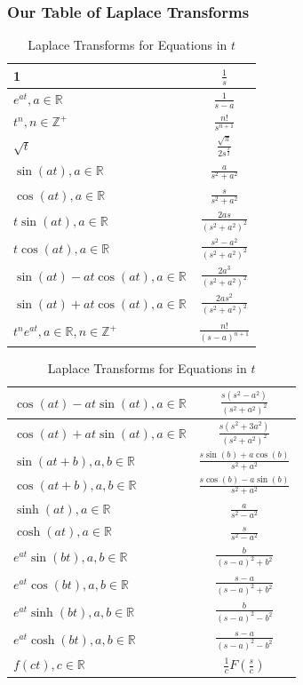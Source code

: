 \documentclass[a4paper,twoside]{article}
\begin{document}
		\subsubsection{Our Table of Laplace Transforms}
			\bgroup
			\everymath{\displaystyle}
			\def\arraystretch{2.5}
			\begin{table}[H]
				\footnotesize
				\begin{tabular}[t]{|p{5cm}|c|}
					\hline
					1&$\frac{1}{s}$\\\hline
					$e^{at},a\in\mathbb{R}$&$\frac{1}{s-a}$\\\hline
					$t^n,n\in\mathbb{Z}^+$&$\frac{n!}{s^{n+1}}$\\\hline
					$\sqrt{t}$&$\frac{\sqrt{\pi}}{2s^{\frac{3}{2}}}$\\\hline
					$\sin(at),a\in\mathbb{R}$&$\frac{a}{s^2+a^2}$\\\hline
					$\cos(at),a\in\mathbb{R}$&$\frac{s}{s^2+a^2}$\\\hline
					$t\sin(at),a\in\mathbb{R}$&$\frac{2as}{(s^2+a^2)^2}$\\\hline
					$t\cos(at),a\in\mathbb{R}$&$\frac{s^2-a^2}{(s^2+a^2)^2}$\\\hline
					$\sin(at)-at\cos(at),a\in\mathbb{R}$&$\frac{2a^3}{(s^2+a^2)^2}$\\\hline
					$\sin(at)+at\cos(at),a\in\mathbb{R}$&$\frac{2as^2}{(s^2+a^2)^2}$\\\hline
					$t^ne^{at},a\in\mathbb{R},n\in\mathbb{Z}^+$&$\frac{n!}{(s-a)^{n+1}}$\\\hline
				\end{tabular}
				\hfill
				\begin{tabular}[t]{|p{5cm}|c|}
					\hline
					$\cos(at)-at\sin(at),a\in\mathbb{R}$&$\frac{s(s^2-a^2)}{(s^2+a^2)^2}$\\\hline
					$\cos(at)+at\sin(at),a\in\mathbb{R}$&$\frac{s(s^2+3a^2)}{(s^2+a^2)^2}$ \\\hline
					$\sin(at+b),a,b\in\mathbb{R}$&$\frac{s\sin(b)+a\cos(b)}{s^2+a^2}$\\\hline
					$\cos(at+b),a,b\in\mathbb{R}$&$\frac{s\cos(b)-a\sin(b)}{s^2+a^2}$ \\\hline   
					$\sinh(at),a\in\mathbb{R}$&$\frac{a}{s^2-a^2}$\\\hline
					$\cosh(at),a\in\mathbb{R}$&$\frac{s}{s^2-a^2}$\\\hline
					$e^{at}\sin(bt),a,b\in\mathbb{R}$&$\frac{b}{(s-a)^2+b^2}$\\\hline
					$e^{at}\cos(bt),a,b\in\mathbb{R}$&$\frac{s-a}{(s-a)^2+b^2}$\\\hline
					$e^{at}\sinh(bt),a,b\in\mathbb{R}$&$\frac{b}{(s-a)^2-b^2}$\\\hline
					$e^{at}\cosh(bt),a,b\in\mathbb{R}$&$\frac{s-a}{(s-a)^2-b^2}$\\\hline
					$f(ct),c\in\mathbb{R}$&$\frac{1}{c}F(\frac{s}{c})$\\\hline
				\end{tabular}
				\caption{Laplace Transforms for Equations in $t$}
			\end{table}
			\everymath{}
			\egroup
\end{document}
